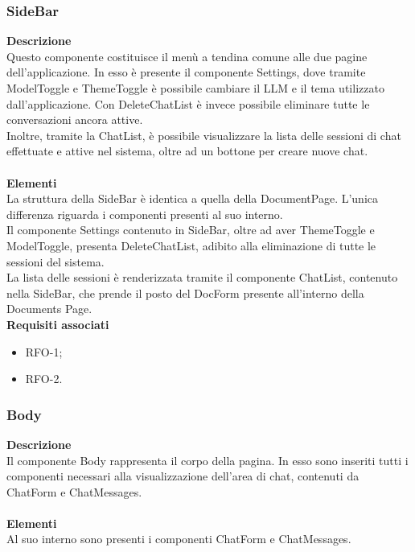 \subsubsection{SideBar}
\textbf{Descrizione}\\
Questo componente costituisce il menù a tendina comune alle due pagine dell’applicazione. In esso è presente il componente Settings, dove tramite ModelToggle e ThemeToggle è possibile cambiare il LLM e il tema utilizzato dall’applicazione. Con DeleteChatList è invece possibile eliminare tutte le conversazioni ancora attive.\\
Inoltre, tramite la ChatList, è possibile visualizzare la lista delle sessioni di chat effettuate e attive nel sistema, oltre ad un bottone per creare nuove chat.\\ \\
\textbf{Elementi}\\
La struttura della SideBar è identica a quella della DocumentPage. L'unica differenza riguarda i componenti presenti al suo interno.\\
Il componente Settings contenuto in SideBar, oltre ad aver ThemeToggle e ModelToggle, presenta DeleteChatList, adibito alla eliminazione di tutte le sessioni del sistema.\\
La lista delle sessioni è renderizzata tramite il componente ChatList, contenuto nella SideBar, che prende il posto del DocForm presente all'interno della Documents Page.
\\


\textbf{Requisiti associati}
\begin{itemize}[itemsep=-4pt]
    \item RFO-1;
    \item RFO-2.
\end{itemize}

\subsubsection{Body}

\textbf{Descrizione}\\
Il componente Body rappresenta il corpo della pagina. In esso sono inseriti tutti i componenti necessari alla visualizzazione dell'area di chat, contenuti da ChatForm e ChatMessages.\\ \\
\textbf{Elementi}\\
Al suo interno sono presenti i componenti ChatForm e ChatMessages.

